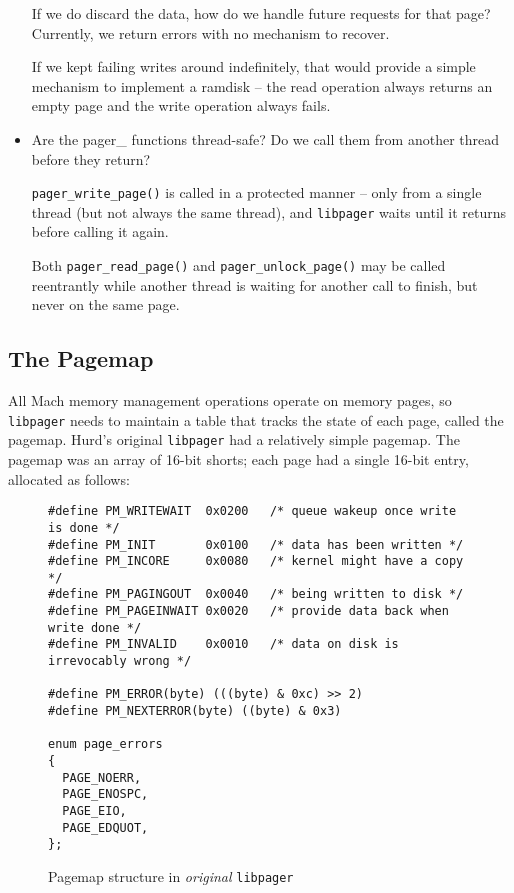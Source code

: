 \documentclass{article}
\def\libpager{{\tt libpager}\xspace}
\begin{document}
\begin{itemize}
  If we do discard the data, how do we handle future requests for that
  page?  Currently, we return errors with no mechanism to recover.

  If we kept failing writes around indefinitely, that would provide a
  simple mechanism to implement a ramdisk -- the read operation always
  returns an empty page and the write operation always fails.

\item Are the pager_ functions thread-safe?  Do we call them from
  another thread before they return?

  {\tt pager_write_page()} is called in a protected manner -- only
  from a single thread (but not always the same thread), and \libpager
  waits until it returns before calling it again.

  Both {\tt pager_read_page()} and {\tt pager_unlock_page()} may be
  called reentrantly while another thread is waiting for another call
  to finish, but never on the same page.

\end{itemize}


\subsection{The Pagemap}

All Mach memory management operations operate on memory pages, so
\libpager needs to maintain a table that tracks the state of each
page, called the pagemap.  Hurd's original \libpager had a relatively
simple pagemap.  The pagemap was an array of 16-bit shorts; each page
had a single 16-bit entry, allocated as follows:

\begin{figure}[h]
\begin{mdframed}[backgroundcolor=lightblue]
\begin{verbatim}
#define PM_WRITEWAIT  0x0200   /* queue wakeup once write is done */
#define PM_INIT       0x0100   /* data has been written */
#define PM_INCORE     0x0080   /* kernel might have a copy */
#define PM_PAGINGOUT  0x0040   /* being written to disk */
#define PM_PAGEINWAIT 0x0020   /* provide data back when write done */
#define PM_INVALID    0x0010   /* data on disk is irrevocably wrong */

#define PM_ERROR(byte) (((byte) & 0xc) >> 2)
#define PM_NEXTERROR(byte) ((byte) & 0x3)

enum page_errors
{
  PAGE_NOERR,
  PAGE_ENOSPC,
  PAGE_EIO,
  PAGE_EDQUOT,
};
\end{verbatim}
\end{mdframed}
\caption{Pagemap structure in {\it original} {\tt libpager}}
\end{figure}
\end{document}
